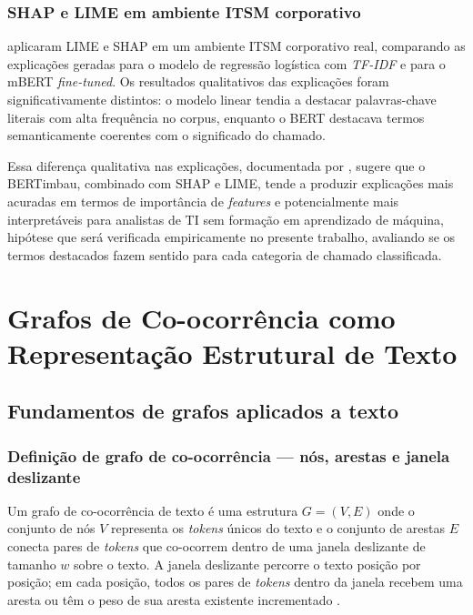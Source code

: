 \documentclass[
    12pt,                %
    openright,           %
    oneside,             %
    a4paper,             %
    english,             %
    brazil               %
]{abntex2}
\begin{document}
\subsubsection{SHAP e LIME em ambiente ITSM corporativo}
\label{subsubsec:xai_razma}

 aplicaram LIME e SHAP em um ambiente ITSM corporativo real, comparando as explicações geradas para o modelo de regressão logística com \textit{TF-IDF} e para o mBERT \textit{fine-tuned}. Os resultados qualitativos das explicações foram significativamente distintos: o modelo linear tendia a destacar palavras-chave literais com alta frequência no corpus, enquanto o BERT destacava termos semanticamente coerentes com o significado do chamado.

Essa diferença qualitativa nas explicações, documentada por 
, sugere que o BERTimbau, combinado com SHAP 
e LIME, tende a produzir explicações mais acuradas em termos de 
importância de \textit{features} e potencialmente mais interpretáveis 
para analistas de TI sem formação em aprendizado de máquina, hipótese que será verificada empiricamente no presente trabalho, 
avaliando se os termos destacados fazem sentido para cada categoria 
de chamado classificada.

\section{Grafos de Co-ocorrência como Representação Estrutural de Texto}
\label{sec:grafos}

\subsection{Fundamentos de grafos aplicados a texto}
\label{subsec:grafos_fundamentos}

\subsubsection{Definição de grafo de co-ocorrência — nós, arestas e janela deslizante}
\label{subsubsec:grafos_definicao}

Um grafo de co-ocorrência de texto é uma estrutura $G = (V, E)$ onde o conjunto de nós $V$ representa os \textit{tokens} únicos do texto e o conjunto de arestas $E$ conecta pares de \textit{tokens} que co-ocorrem dentro de uma janela deslizante de tamanho $w$ sobre o texto. A janela deslizante percorre o texto posição por posição; em cada posição, todos os pares de \textit{tokens} dentro da janela recebem uma aresta ou têm o peso de sua aresta existente incrementado \cite{yao2019}.
\end{document}

